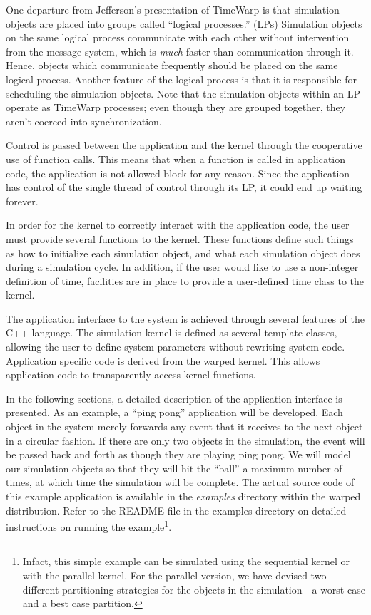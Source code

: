 \documentclass[11pt]{report}
\begin{document}
One departure from Jefferson's presentation of TimeWarp is that
simulation objects are placed into groups called ``logical processes.''
(LPs) Simulation objects on the same logical process communicate with
each other without intervention from the message system, which is
{\it much} faster than communication through it.  Hence, objects
which communicate frequently should be placed on the same logical
process.  Another feature of the logical process is that it is
responsible for scheduling the simulation objects.  Note that the
simulation objects within an LP operate as TimeWarp processes; even
though they are grouped together, they aren't coerced into
synchronization.

Control is passed between the application and the kernel through the
cooperative use of function calls.  This means that when a function is
called in application code, the application is not allowed block for any
reason.  Since the application has control of the single thread of
control through its LP, it could end up waiting forever.

In order for the kernel to correctly interact with the application code,
the user must provide several functions to the kernel. These functions
define such things as how to initialize each simulation object, and what
each simulation object does during a simulation cycle.  In addition, if
the user would like to use a non-integer definition of time, facilities
are in place to provide a user-defined time class to the kernel.

The application interface to the system is achieved through several
features of the C++ language.  The simulation kernel is defined as
several template classes, allowing the user to define system parameters
without rewriting system code.  Application specific code is derived
from the {\sc warped} kernel. This allows application code to
transparently access kernel functions.  

In the following sections, a detailed description of the application
interface is presented.  As an example, a ``ping pong'' application will
be developed.  Each object in the system merely forwards any event that it
receives to the next object in a circular fashion.  If there are only two
objects in the simulation, the event will be passed back and forth as
though they are playing ping pong.  We will model our simulation objects
so that they will hit the ``ball'' a maximum number of times, at which
time the simulation will be complete. The actual source code of this
example application is available in the {\it examples} directory within
the {\sc warped} distribution. Refer to the {\sf README} file in the
examples directory on detailed instructions on running the
example\footnote{Infact, this simple example can be simulated using the
sequential kernel or with the parallel kernel. For the parallel version,
we have devised two different partitioning strategies for the objects in
the simulation - a worst case and a best case partition.}.
\end{document}

